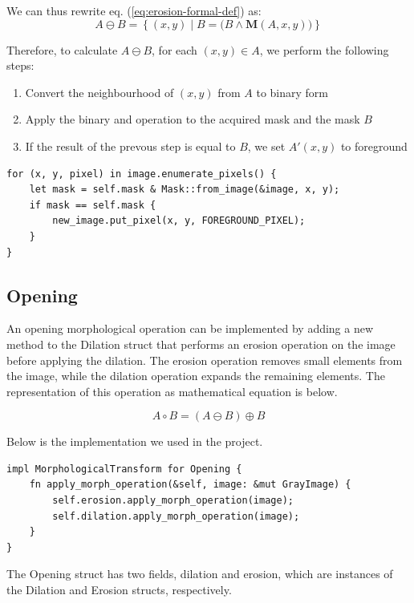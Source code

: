 \documentclass[12pt]{article}
\begin{document}
\pagebreak[2]
We can thus rewrite eq. (\ref{eq:erosion-formal-def}) as:
\begin{equation}
    A \ominus B = \left\{ (x,y) \mid B = \big( B \land \mathbf{M}(A,x,y) \big) \right\}
\end{equation}


Therefore, to calculate $A \ominus B$, for each $(x,y) \in A$, we perform the following steps:
\begin{enumerate}
    \item Convert the neighbourhood of $(x,y)$ from $A$ to binary form
    \item Apply the binary and operation to the acquired mask and the mask $B$
    \item If the result of the prevous step is equal to $B$, we set $A'(x,y)$ to foreground
\end{enumerate}

\pagebreak[3]
\begin{lstlisting}
for (x, y, pixel) in image.enumerate_pixels() {
    let mask = self.mask & Mask::from_image(&image, x, y);
    if mask == self.mask {
        new_image.put_pixel(x, y, FOREGROUND_PIXEL);
    }
}
\end{lstlisting}

\subsection{Opening}
An opening morphological operation can be implemented by adding a new method to the Dilation struct that performs an erosion operation on the image before applying the dilation. The erosion operation removes small elements from the image, while the dilation operation expands the remaining elements. The representation of this operation as mathematical equation is below.

\begin{equation}
   A \circ B  = ( A \ominus B )\oplus B
\end{equation}

Below is the implementation we used in the project.
\begin{lstlisting}
impl MorphologicalTransform for Opening {
    fn apply_morph_operation(&self, image: &mut GrayImage) {
        self.erosion.apply_morph_operation(image);
        self.dilation.apply_morph_operation(image);
    }
}
\end{lstlisting}
The Opening struct has two fields, dilation and erosion, which are instances of the Dilation and Erosion structs, respectively.
\end{document}
